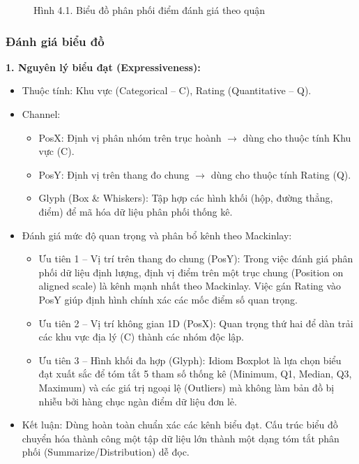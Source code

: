 \begin{figure}[H]
    \centering
    \caption{Hình 4.1. Biểu đồ phân phối điểm đánh giá theo quận}
    \label{fig:domain-task4-chart1}
\end{figure}

\subsubsection{Đánh giá biểu đồ}

\textbf{1. Nguyên lý biểu đạt (Expressiveness):}

\begin{itemize}
    \item Thuộc tính: Khu vực (Categorical -- C), Rating (Quantitative -- Q).
    \item Channel:
    \begin{itemize}
        \item PosX: Định vị phân nhóm trên trục hoành $\rightarrow$ dùng cho thuộc tính Khu vực (C).
        \item PosY: Định vị trên thang đo chung $\rightarrow$ dùng cho thuộc tính Rating (Q).
        \item Glyph (Box \& Whiskers): Tập hợp các hình khối (hộp, đường thẳng, điểm) để mã hóa dữ liệu phân phối thống kê.
    \end{itemize}
    \item Đánh giá mức độ quan trọng và phân bổ kênh theo Mackinlay:
    \begin{itemize}
        \item Ưu tiên 1 -- Vị trí trên thang đo chung (PosY): Trong việc đánh giá phân phối dữ liệu định lượng, định vị điểm trên một trục chung (Position on aligned scale) là kênh mạnh nhất theo Mackinlay. Việc gán Rating vào PosY giúp định hình chính xác các mốc điểm số quan trọng.
        \item Ưu tiên 2 -- Vị trí không gian 1D (PosX): Quan trọng thứ hai để dàn trải các khu vực địa lý (C) thành các nhóm độc lập.
        \item Ưu tiên 3 -- Hình khối đa hợp (Glyph): Idiom Boxplot là lựa chọn biểu đạt xuất sắc để tóm tắt 5 tham số thống kê (Minimum, Q1, Median, Q3, Maximum) và các giá trị ngoại lệ (Outliers) mà không làm bản đồ bị nhiễu bởi hàng chục ngàn điểm dữ liệu đơn lẻ.
    \end{itemize}
    \item Kết luận: Dùng hoàn toàn chuẩn xác các kênh biểu đạt. Cấu trúc biểu đồ chuyển hóa thành công một tập dữ liệu lớn thành một dạng tóm tắt phân phối (Summarize/Distribution) dễ đọc.
\end{itemize}

